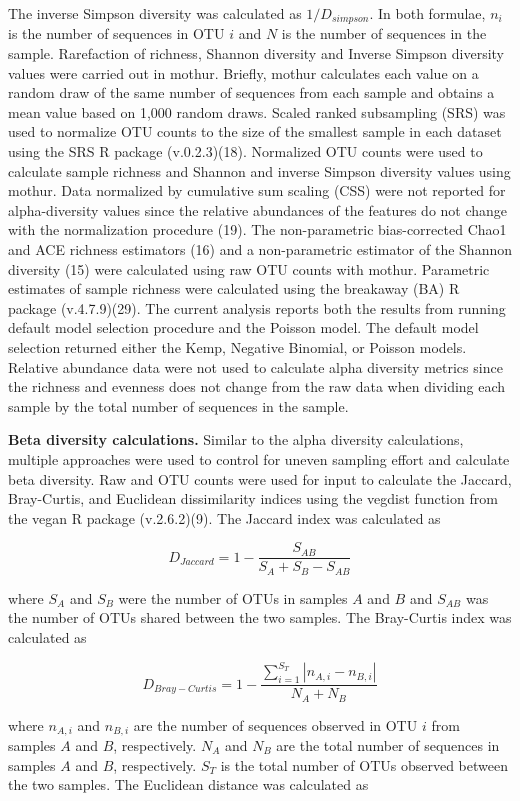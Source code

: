 \documentclass[
]{article}
\begin{document}
The inverse Simpson diversity was calculated as \(1/D_{simpson}\). In
both formulae, \(n_i\) is the number of sequences in OTU \(i\) and \(N\)
is the number of sequences in the sample. Rarefaction of richness,
Shannon diversity and Inverse Simpson diversity values were carried out
in mothur. Briefly, mothur calculates each value on a random draw of the
same number of sequences from each sample and obtains a mean value based
on 1,000 random draws. Scaled ranked subsampling (SRS) was used to
normalize OTU counts to the size of the smallest sample in each dataset
using the SRS R package (v.0.2.3)(18). Normalized OTU counts were used
to calculate sample richness and Shannon and inverse Simpson diversity
values using mothur. Data normalized by cumulative sum scaling (CSS)
were not reported for alpha-diversity values since the relative
abundances of the features do not change with the normalization
procedure (19). The non-parametric bias-corrected Chao1 and ACE richness
estimators (16) and a non-parametric estimator of the Shannon diversity
(15) were calculated using raw OTU counts with mothur. Parametric
estimates of sample richness were calculated using the breakaway (BA) R
package (v.4.7.9)(29). The current analysis reports both the results
from running default model selection procedure and the Poisson model.
The default model selection returned either the Kemp, Negative Binomial,
or Poisson models. Relative abundance data were not used to calculate
alpha diversity metrics since the richness and evenness does not change
from the raw data when dividing each sample by the total number of
sequences in the sample.

\textbf{Beta diversity calculations.} Similar to the alpha diversity
calculations, multiple approaches were used to control for uneven
sampling effort and calculate beta diversity. Raw and OTU counts were
used for input to calculate the Jaccard, Bray-Curtis, and Euclidean
dissimilarity indices using the vegdist function from the vegan R
package (v.2.6.2)(9). The Jaccard index was calculated as

\[D_{Jaccard}=1-\frac{S_{AB}}{S_A+S_B-S_{AB}}\]

where \(S_A\) and \(S_B\) were the number of OTUs in samples \(A\) and
\(B\) and \(S_{AB}\) was the number of OTUs shared between the two
samples. The Bray-Curtis index was calculated as

\[D_{Bray-Curtis}=1-\frac{\sum_{i=1}^{S_T} \left| n_{A,i} - n_{B,i}\right| }{ N_A + N_B}\]

where \(n_{A,i}\) and \(n_{B,i}\) are the number of sequences observed
in OTU \(i\) from samples \(A\) and \(B\), respectively. \(N_A\) and
\(N_B\) are the total number of sequences in samples \(A\) and \(B\),
respectively. \(S_T\) is the total number of OTUs observed between the
two samples. The Euclidean distance was calculated as
\end{document}
